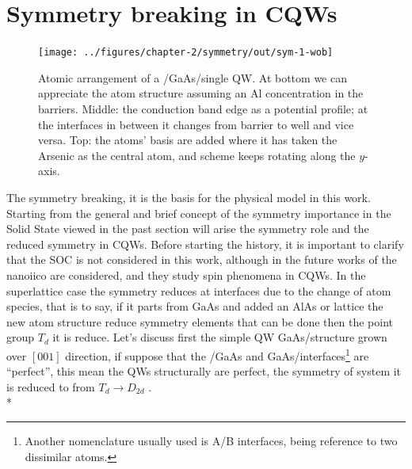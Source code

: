 \section{Symmetry breaking in CQWs}
\label{subsec:chapter-2-symmetry-breaking}
\vspace{-10mm}
\begin{figure}[ht!]
	\centering
		\texttt{[image: ../figures/chapter-2/symmetry/out/sym-1-wob]}
	\caption{
Atomic arrangement of a \algaas/GaAs/\algaas single \gls{QW}. At bottom we can appreciate the atom structure assuming
an Al concentration in the barriers. Middle: the conduction band edge as a potential profile; at the interfaces in between it changes from barrier to well and vice versa. Top: the atoms' basis are added where it has taken the Arsenic as the central atom, and scheme keeps rotating along the $y$-axis.
}
	\label{fig:subsubsection-2.2-qws-symmetry}
\end{figure}
The symmetry breaking, it is the basis for the physical model in this work. Starting from the general and brief concept of the symmetry importance in the Solid State viewed in the past section will arise the symmetry role and the reduced symmetry in \gls{CQWs}. Before starting the history, it is important to clarify that the SOC is not considered in this work, although in the future works of the \gls{nanoiico} are considered, and they study spin phenomena in \gls{CQWs}. 
In the superlattice case the symmetry reduces at interfaces due to the change of atom species, that is to say, if it parts from GaAs and added an AlAs or \algaas lattice the new atom structure reduce symmetry elements that can be done then the point group $T_{d}$ it is reduce. 
Let's discuss first the simple QW GaAs/\algaas structure grown over $\left[001\right]$ direction, if suppose that the \algaas/GaAs and GaAs/\algaas interfaces\footnote{Another nomenclature usually used is A/B interfaces, being reference to two dissimilar atoms.} are ``perfect'', this mean the \gls{QW}s structurally are perfect,  the symmetry of system it is reduced to from $T_{d}\to D_{2d}$ \cite{magri2000anticrossing,ivchenko1996heavylight}.  \\*
